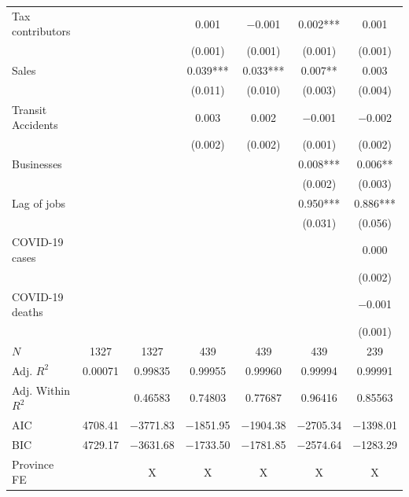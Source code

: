 \documentclass[11pt,a4paper]{article}\usepackage[]{graphicx}\usepackage[]{xcolor}
\begin{document}
\begin{table}[h]
\begin{tabular}[t]{lcccccc}
Tax contributors &  &  & \num{0.001} & \num{-0.001} & \num{0.002}*** & \num{0.001}\\
 &  &  & (\num{0.001}) & (\num{0.001}) & (\num{0.001}) & (\num{0.001})\\
Sales &  &  & \num{0.039}*** & \num{0.033}*** & \num{0.007}** & \num{0.003}\\
 &  &  & (\num{0.011}) & (\num{0.010}) & (\num{0.003}) & (\num{0.004})\\
Transit Accidents &  &  & \num{0.003} & \num{0.002} & \num{-0.001} & \num{-0.002}\\
 &  &  & (\num{0.002}) & (\num{0.002}) & (\num{0.001}) & (\num{0.002})\\
Businesses &  &  &  &  & \num{0.008}*** & \num{0.006}**\\
 &  &  &  &  & (\num{0.002}) & (\num{0.003})\\
Lag of jobs &  &  &  &  & \num{0.950}*** & \num{0.886}***\\
 &  &  &  &  & (\num{0.031}) & (\num{0.056})\\
COVID-19 cases &  &  &  &  &  & \num{0.000}\\
 &  &  &  &  &  & (\num{0.002})\\
COVID-19 deaths &  &  &  &  &  & \num{-0.001}\\
 &  &  &  &  &  & (\num{0.001})\\
\midrule
$N$ & \num{1327} & \num{1327} & \num{439} & \num{439} & \num{439} & \num{239}\\
Adj. $R^2$ & \num{0.00071} & \num{0.99835} & \num{0.99955} & \num{0.99960} & \num{0.99994} & \num{0.99991}\\
Adj. Within $R^2$ &  & \num{0.46583} & \num{0.74803} & \num{0.77687} & \num{0.96416} & \num{0.85563}\\
AIC & \num{4708.41} & \num{-3771.83} & \num{-1851.95} & \num{-1904.38} & \num{-2705.34} & \num{-1398.01}\\
BIC & \num{4729.17} & \num{-3631.68} & \num{-1733.50} & \num{-1781.85} & \num{-2574.64} & \num{-1283.29}\\
Province FE &  & X & X & X & X & X\\
\bottomrule
\end{tabular}


\end{table}
\end{document}
